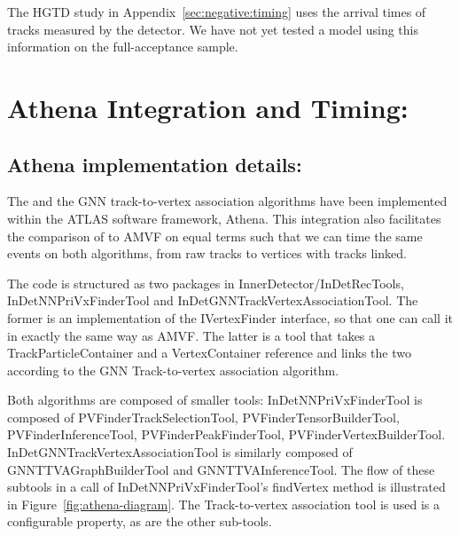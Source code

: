 The HGTD study in Appendix~\ref{sec:negative:timing} uses the arrival
times of tracks measured by the detector. We have not yet tested a model
using this information on the full-acceptance sample.

\section{Athena Integration and Timing:}
\subsection{Athena implementation details:}
The \pvf{} and the GNN track-to-vertex association algorithms have been implemented within the ATLAS software framework, Athena. This integration also facilitates the comparison of
\pvf{} to AMVF on equal terms such that we can time the same events on both algorithms, from raw tracks to vertices with tracks linked.

The code is structured as two packages in InnerDetector/InDetRecTools, InDetNNPriVxFinderTool and InDetGNNTrackVertexAssociationTool. The former is an implementation of the IVertexFinder interface, so that one can call it in exactly the same way as AMVF. The latter is a tool that takes a TrackParticleContainer and a VertexContainer reference and links the two according to the GNN Track-to-vertex association algorithm.

Both algorithms are composed of smaller tools: InDetNNPriVxFinderTool is composed of PVFinderTrackSelectionTool, PVFinderTensorBuilderTool, PVFinderInferenceTool, PVFinderPeakFinderTool, PVFinderVertexBuilderTool. InDetGNNTrackVertexAssociationTool is similarly composed of GNNTTVAGraphBuilderTool and GNNTTVAInferenceTool. The flow of these subtools in a call of InDetNNPriVxFinderTool's findVertex method is illustrated in Figure~\ref{fig:athena-diagram}. The Track-to-vertex association tool is used is a configurable property, as are the other sub-tools.

